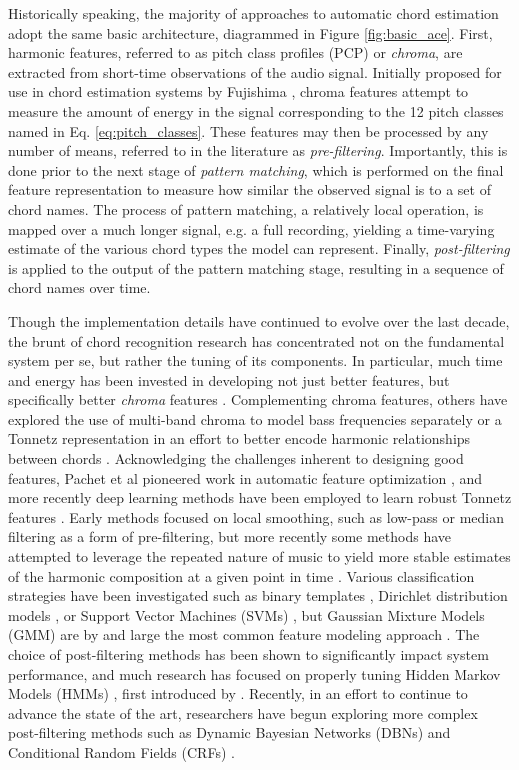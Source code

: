 Historically speaking, the majority of approaches to automatic chord estimation adopt the same basic architecture, diagrammed in Figure \ref{fig:basic_ace}.
First, harmonic features, referred to as pitch class profiles (PCP) or \emph{chroma}, are extracted from short-time observations of the audio signal.
Initially proposed for use in chord estimation systems by Fujishima \cite{fujishima1999}, chroma features attempt to measure the amount of energy in the signal corresponding to the 12 pitch classes named in Eq. \ref{eq:pitch_classes}.
These features may then be processed by any number of means, referred to in the literature as \emph{pre-filtering}.
Importantly, this is done prior to the next stage of \emph{pattern matching}, which is performed on the final feature representation to measure how similar the observed signal is to a set of chord names.
The process of pattern matching, a relatively local operation, is mapped over a much longer signal, e.g. a full recording, yielding a time-varying estimate of the various chord types the model can represent.
Finally, \emph{post-filtering} is applied to the output of the pattern matching stage, resulting in a sequence of chord names over time.

Though the implementation details have continued to evolve over the last decade, the brunt of chord recognition research has concentrated not on the fundamental system per se, but rather the tuning of its components.
In particular, much time and energy has been invested in developing not just better features, but specifically better \emph{chroma} features \cite{muller2010}.
Complementing chroma features, others have explored the use of multi-band chroma to model bass frequencies separately \cite{Mauch2009?} or a Tonnetz representation in an effort to better encode harmonic relationships between chords \cite{Lee2007}.
Acknowledging the challenges inherent to designing good features, Pachet et al pioneered work in automatic feature optimization \cite{pachet2004}, and more recently deep learning methods have been employed to learn robust Tonnetz features \cite{ejh2011}.
Early methods focused on local smoothing, such as low-pass \cite{} or median \cite{} filtering as a form of pre-filtering, but more recently some methods have attempted to leverage the repeated nature of music to yield more stable estimates of the harmonic composition at a given point in time \cite{Cho2011}.
Various classification strategies have been investigated such as binary templates \cite{?}, Dirichlet distribution models \cite{Burgoyne2008?}, or Support Vector Machines (SVMs) \cite{weller2009}, but Gaussian Mixture Models (GMM) are by and large the most common feature modeling approach \cite{a,b,c}.
The choice of post-filtering methods has been shown to significantly impact system performance, and much research has focused on properly tuning Hidden Markov Models (HMMs) \cite{Cho2010}, first introduced by \cite{sheh2003}.
Recently, in an effort to continue to advance the state of the art, researchers have begun exploring more complex post-filtering methods such as Dynamic Bayesian Networks (DBNs) \cite{mauch2010b, McVicar2013} and Conditional Random Fields (CRFs) \cite{?}.


